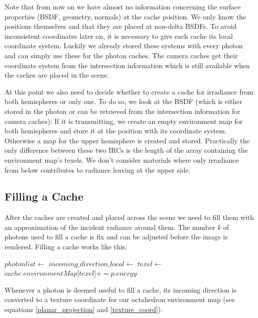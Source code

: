 Note that from now on we have almost no information concerning the surface properties (BSDF, geometry, normals) at the cache position. We only know the positions themselves and that they are placed at non-delta BSDFs. To avoid inconsistent coordinates later on, it is necessary to give each cache its local coordinate system. Luckily we already stored these systems with every photon and can simply use these for the photon caches. The camera caches get their coordinate system from the intersection information which is still available when the caches are placed in the scene.

At this point we also need to decide whether to create a cache for irradiance from both hemispheres or only one. To do so, we look at the BSDF (which is either stored in the photon or can be retrieved from the intersection information for camera caches): If it is transmitting, we create an empty environment map for both hemispheres and store it at the position with its coordinate system. Otherwise a map for the upper hemisphere is created and stored. Practically the only difference between these two IRCs is the length of the array containing the environment map's texels. We don't consider materials where only irradiance from below contributes to radiance leaving at the upper side.

\subsection{Filling a Cache}
After the caches are created and placed across the scene we need to fill them with an approximation of the incident radiance around them. The number $k$ of photons used to fill a cache is fix and can be adjusted before the image is rendered. Filling a cache works like this:
\newline
\begin{algorithmic}
\State $photon list \gets $ 
	\State $incoming\_direction\_local \gets $
        \State $texel \gets $ 
        \State $cache.environmentMap\lbrack texel \rbrack += p.energy$
    \EndIf
\EndFor
\end{algorithmic}

Whenever a photon is deemed useful to fill a cache, its incoming direction is converted to a texture coordinate for our octahedron environment map (see equations \ref{planar_projection} and \ref{texture_coord}).

